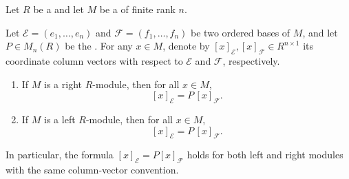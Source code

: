 \begin{lemma} \label{lemma:coordinate_vector_transforms_by_change_of_basis_matrix_for_a_free_module_over_a_ring}
    Let $R$ be a  and let $M$ be a  of finite rank $n$.

    Let $\mathcal{E} = (e_1,\ldots,e_n)$ and $\mathcal{F} = (f_1,\ldots,f_n)$ be two ordered bases of $M$, and let $P \in M_n(R)$ be the . For any $x \in M$, denote by $[x]_\mathcal{E}, [x]_\mathcal{F} \in R^{n \times 1}$ its coordinate column vectors with respect to $\mathcal{E}$ and $\mathcal{F}$, respectively.

    \begin{enumerate}
        \item If $M$ is a right $R$-module, then for all $x \in M$,
        $$[x]_\mathcal{E} = P \, [x]_\mathcal{F}.$$

        \item If $M$ is a left $R$-module, then for all $x \in M$,
        $$[x]_\mathcal{E} = P \, [x]_\mathcal{F}.$$
    \end{enumerate}

    In particular, the formula $[x]_\mathcal{E} = P [x]_\mathcal{F}$ holds for both left and right modules with the same column-vector convention.
\end{lemma}
